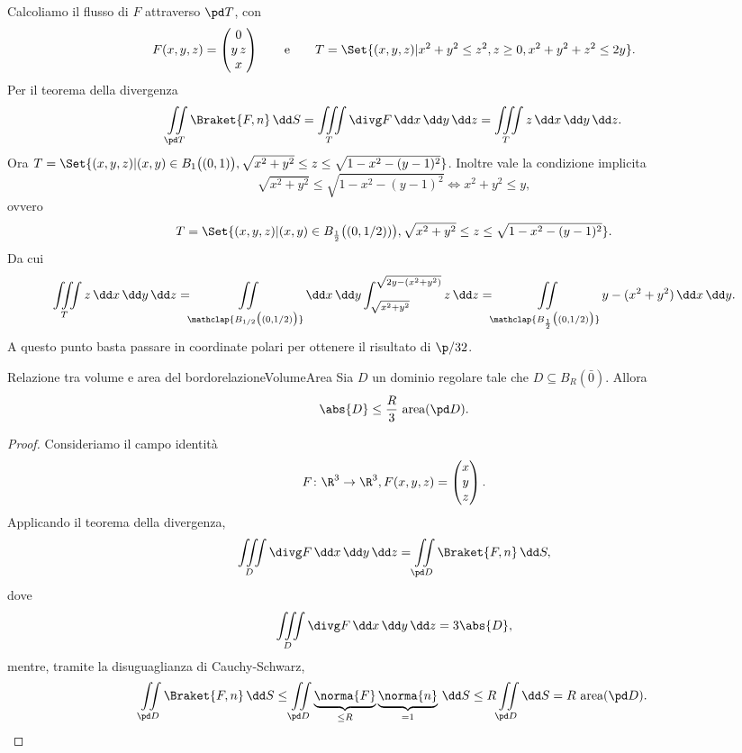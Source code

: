 \begin{ese}
	Calcoliamo il flusso di \(F\) attraverso \(\pd T\), con
	\[
		F(x,y,z) = \begin{pmatrix}0\\y\,z\\x\end{pmatrix} \qquad\text{e}\qquad T=\Set{(x,y,z) | x^2+y^2\le z^2, z\ge 0, x^2+y^2+z^2 \le 2y}.
	\]
	Per il teorema della divergenza
	\[
		\iint\limits_{\pd T} \Braket{F,n}\,\dd S = \iiint\limits_T \divg F\,\dd x\,\dd y\,\dd z = \iiint\limits_T z\,\dd x\,\dd y\,\dd z.
	\]
	Ora \(T=\Set{(x,y,z) | (x,y)\in B_1\big((0,1)\big), \sqrt{x^2+y^2} \le z \le \sqrt{1-x^2-(y-1)^2}}\).
	Inoltre vale la condizione implicita
	\[
		\sqrt{x^2+y^2} \le \sqrt{1-x^2-(y-1)^2} \iff x^2+y^2 \le y,
	\]
	ovvero
	\[
		T=\Set{(x,y,z) | (x,y)\in B_{\frac{1}{2}}\big((0,1/2))\big), \sqrt{x^2+y^2} \le z \le \sqrt{1-x^2-(y-1)^2}}.
	\]
	Da cui
	\[
		\iiint\limits_T z\,\dd x\,\dd y\,\dd z = \iint\limits_{\mathclap{B_{1/2}\big((0,1/2)\big)}}\dd x\,\dd y \int_{\sqrt{x^2+y^2}}^{\sqrt{2y-(x^2+y^2)}}z\,\dd z = \iint\limits_{\mathclap{B_{\frac{1}{2}}\big((0,1/2)\big)}} y-(x^2+y^2)\,\dd x\,\dd y.
	\]
	A questo punto basta passare in coordinate polari per ottenere il risultato di \(\p/32\).
\end{ese}
%
%
\begin{prop}{Relazione tra volume e area del bordo}{relazioneVolumeArea}
	Sia \(D\) un dominio regolare tale che \(D\subseteq B_R(\bar{0})\).
	Allora
	\[
		\abs{D} \le \frac{R}{3} \text{ area}(\pd D).
	\]
\end{prop}

\begin{proof}
	Consideriamo il campo identità
	\[
		F\colon \R^3 \to \R^3, F(x,y,z) = \begin{pmatrix}x\\y\\z\end{pmatrix}.
	\]
	Applicando il teorema della divergenza,
	\[
		\iiint\limits_D \divg F\,\dd x\,\dd y\,\dd z = \iint\limits_{\pd D} \Braket{F,n}\,\dd S,
	\]
	dove
	\[
		\iiint\limits_D \divg F\,\dd x\,\dd y\,\dd z = 3\abs{D},
	\]
	mentre, tramite la disuguaglianza di Cauchy-Schwarz,
	\[
		\iint\limits_{\pd D} \Braket{F,n}\,\dd S \le \iint\limits_{\pd D} \underbrace{\norma{F}}_{\le R} \underbrace{\norma{n}}_{= 1}\,\dd S \le R \iint\limits_{\pd D}\dd S = R \text{ area}(\pd D).\qedhere
	\]
\end{proof}

